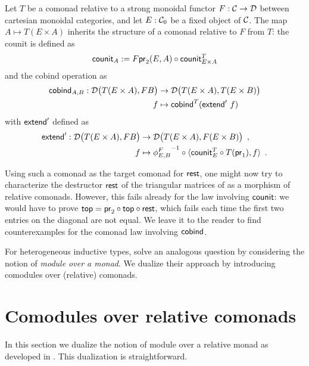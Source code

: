 \documentclass[conference,10pt]{IEEEtran}
\renewcommand{\alpha}{\phi}
\begin{document}
\begin{definition}\label{product_comonad}
  Let $T$ be a comonad relative to a strong monoidal functor $F:\C\to\D$ between cartesian monoidal categories,
  and let $E:\C_0$ be a fixed object of $\C$.
 The map $A\mapsto T(E\times A)$ inherits the structure of a comonad relative to $F$ from $T$: the 
 counit is defined as
   \[ \counit_A := \comp{\counit^T_{E\times A}}{F\pr_2(E,A)} \]
  and the cobind operation as
   \begin{align*} 
            \cobind_{A,B} : \D\bigl(T(E\times A),FB\bigr) &\to \D\bigl(T(E\times A),T(E\times B)\bigr) \\
              f &\mapsto  \cobind^T(\extend'~f)
   \end{align*}
  with $\extend'$ defined as 
  \begin{align*} \extend' : \D\bigl(T(E\times A),FB\bigr) &\to \D\bigl(T(E\times A), F(E\times B)\bigr) \enspace , \\ 
                                            f & \mapsto \comp{\langle \comp{T(\pr_1)}{\counit^T_E}, f \rangle}{{\alpha^{F}_{E,B}}^{-1}} \enspace .
  \end{align*}
\end{definition}
 Using such a comonad as the target comonad for $\tail$, one might now 
 try to characterize the destructor $\tail$ of the triangular matrices of 
 as a morphism of relative comonads.
 However, this fails already for the law involving $\counit$: we would have to prove $\head = \comp{\tail}{\comp{\head}{\pr_2}}$,
 which fails each time the first two entries on the diagonal are not equal.
 We leave it to the reader to find counterexamples for the comonad law involving $\cobind$.

For heterogeneous inductive types, \textcite{DBLP:journals/iandc/HirschowitzM10} solve an analogous question by considering the notion of
\emph{module over a monad}. We  dualize their approach by introducing comodules over (relative) comonads.



\section{Comodules over relative comonads}\label{sec:comodules}

In this section we dualize the notion of module over a relative monad as developed in \parencite{ahrens_relmonads}.
This dualization is straightforward.
\end{document}
